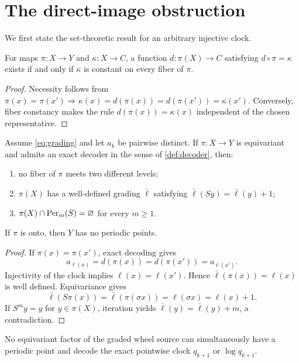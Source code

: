 \section{The direct-image obstruction}
\label{sec:direct-image}

We first state the set-theoretic result for an arbitrary injective clock.

\begin{lemma}
\label{lem:fiber}
For maps $\pi:X\to Y$ and $\kappa:X\to C$, a function
$d:\pi(X)\to C$ satisfying $d\circ\pi=\kappa$ exists if and only if
$\kappa$ is constant on every fiber of $\pi$.
\end{lemma}

\begin{proof}
Necessity follows from
$\pi(x)=\pi(x')\Rightarrow\kappa(x)=d(\pi(x))=d(\pi(x'))=\kappa(x')$.
Conversely, fiber constancy makes the rule $d(\pi(x))=\kappa(x)$ independent
of the chosen representative.
\end{proof}

\begin{theorem}
\label{thm:direct}
Assume \eqref{eq:grading} and let $a_k$ be pairwise distinct.  If
$\pi:X\to Y$ is equivariant and admits an exact decoder in the sense of
\cref{def:decoder}, then:
\begin{enumerate}[label=(\roman*)]
  \item no fiber of $\pi$ meets two different levels;
  \item $\pi(X)$ has a well-defined grading $\bar\ell$ satisfying
  $\bar\ell(Sy)=\bar\ell(y)+1$;
  \item $\pi(X)\cap\operatorname{Per}_m(S)=\varnothing$ for every $m\ge1$.
\end{enumerate}
If $\pi$ is onto, then $Y$ has no periodic points.
\end{theorem}

\begin{proof}
If $\pi(x)=\pi(x')$, exact decoding gives
\[
a_{\ell(x)}=d(\pi(x))=d(\pi(x'))=a_{\ell(x')}.
\]
Injectivity of the clock implies $\ell(x)=\ell(x')$.  Hence
$\bar\ell(\pi(x))=\ell(x)$ is well defined.  Equivariance gives
\[
\bar\ell(S\pi(x))
=\bar\ell(\pi(\sigma x))
=\ell(\sigma x)
=\ell(x)+1.
\]
If $S^my=y$ for $y\in\pi(X)$, iteration yields
$\bar\ell(y)=\bar\ell(y)+m$, a contradiction.
\end{proof}

\begin{corollary}
\label{cor:wheel-direct}
No equivariant factor of the graded wheel source can simultaneously have a
periodic point and decode the exact pointwise clock $q_{k+1}$ or
$\log q_{k+1}$.
\end{corollary}

